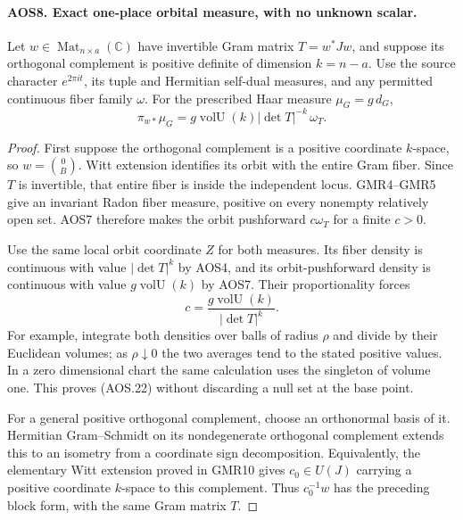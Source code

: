\documentclass[11pt,a4paper]{article}
\numberwithin{equation}{section}
\theoremstyle{remark}\newtheorem{remark}[theorem]{Remark}
\begin{document}
\paragraph{AOS8. Exact one-place orbital measure, with no unknown scalar.}
\label{claim:AOS8}
Let $w\in\operatorname{Mat}_{n\times a}(\mathbb C)$ have invertible
Gram matrix $T=w^*Jw$, and suppose its orthogonal complement is
positive definite of dimension $k=n-a$.  Use the source character
$e^{2\pi it}$, its tuple and Hermitian self-dual measures, and any
permitted continuous fiber family $\omega$.  For the prescribed
Haar measure $\mu_G=g\,d_G$,
\[
            \pi_{w*}\mu_G
                 =g\operatorname{volU}(k)|\det T|^{-k}\,\omega_T.
 \tag{AOS.22}
\]

\begin{proof}
First suppose the orthogonal complement is a positive coordinate
$k$-space, so $w=\binom0B$.  Witt extension identifies its orbit
with the entire Gram fiber.  Since $T$ is invertible, that entire
fiber is inside the independent locus.  GMR4--GMR5 give an invariant
Radon fiber measure, positive on every nonempty relatively open set.
AOS7 therefore makes the orbit pushforward $c\omega_T$ for a finite
$c>0$.

Use the same local orbit coordinate $Z$ for both measures.  Its
fiber density is continuous with value $|\det T|^k$ by AOS4, and
its orbit-pushforward density is continuous with value
$g\operatorname{volU}(k)$ by AOS7.  Their proportionality forces
\[
       c=\frac{g\operatorname{volU}(k)}{|\det T|^k}.
\]
For example, integrate both densities over balls of radius $\rho$
and divide by their Euclidean volumes; as $\rho\downarrow0$ the
two averages tend to the stated positive values.  In a zero
dimensional chart the same calculation uses the singleton of
volume one.  This proves (AOS.22) without discarding a null set at
the base point.

For a general positive orthogonal complement, choose an orthonormal
basis of it.  Hermitian Gram--Schmidt on its nondegenerate
orthogonal complement extends this to an isometry from a coordinate
sign decomposition.  Equivalently, the elementary Witt extension
proved in GMR10 gives $c_0\in U(J)$ carrying a positive coordinate
$k$-space to this complement.  Thus $c_0^{-1}w$ has the preceding
block form, with the same Gram matrix $T$.


\end{proof}
\end{document}
